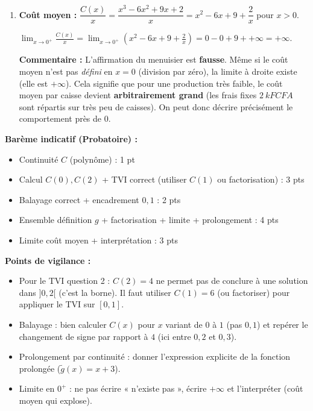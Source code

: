 \documentclass[11pt]{article}
\begin{document}
\begin{corrige}
\begin{enumerate}
\begin{enumerate}
\end{enumerate}
\item \textbf{Coût moyen :} $\dfrac{C(x)}{x} = \dfrac{x^3 - 6x^2 + 9x + 2}{x} = x^2 - 6x + 9 + \dfrac{2}{x}$ pour $x > 0$. \par
$\displaystyle\lim_{x \to 0^+} \frac{C(x)}{x} = \lim_{x \to 0^+} \left(x^2 - 6x + 9 + \frac{2}{x}\right) = 0 - 0 + 9 + \boxed{+\infty} = \boxed{+\infty}$. \par
\textbf{Commentaire :} L'affirmation du menuisier est \textbf{fausse}. Même si le coût moyen n'est pas \emph{défini} en $x=0$ (division par zéro), la limite à droite existe (elle est $+\infty$). Cela signifie que pour une production très faible, le coût moyen par caisse devient \textbf{arbitrairement grand} (les frais fixes $\SI{2}{kFCFA}$ sont répartis sur très peu de caisses). On peut donc décrire précisément le comportement près de $0$.
\end{enumerate}

\textbf{Barème indicatif (Probatoire) :}
\begin{itemize}
\item Continuité $C$ (polynôme) : 1 pt
\item Calcul $C(0), C(2)$ + TVI correct (utiliser $C(1)$ ou factorisation) : 3 pts
\item Balayage correct + encadrement $0,1$ : 2 pts
\item Ensemble définition $g$ + factorisation + limite + prolongement : 4 pts
\item Limite coût moyen + interprétation : 3 pts
\end{itemize}
\textbf{Points de vigilance :}
\begin{itemize}
\item Pour le TVI question 2 : $C(2)=4$ ne permet pas de conclure à une solution dans $]0,2[$ (c'est la borne). Il faut utiliser $C(1)=6$ (ou factoriser) pour appliquer le TVI sur $[0,1]$.
\item Balayage : bien calculer $C(x)$ pour $x$ variant de $0$ à $1$ (pas $0,1$) et repérer le changement de signe par rapport à $4$ (ici entre $0,2$ et $0,3$).
\item Prolongement par continuité : donner l'expression explicite de la fonction prolongée ($\tilde{g}(x)=x+3$).
\item Limite en $0^+$ : ne pas écrire « n'existe pas », écrire $+\infty$ et l'interpréter (coût moyen qui explose).
\end{itemize}
\end{corrige}
\end{document}
